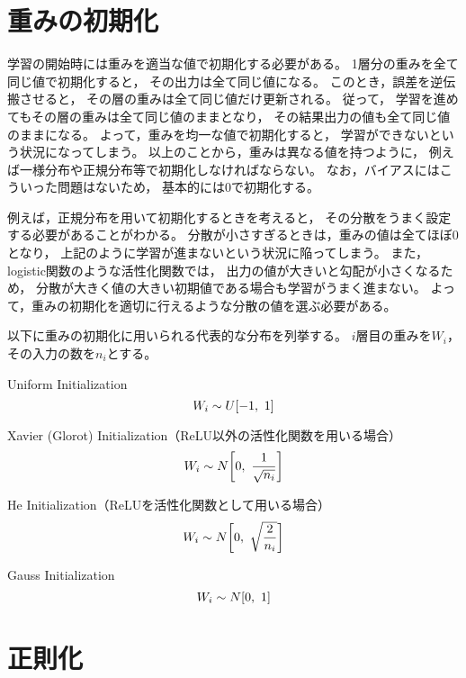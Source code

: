 \documentclass[class=jsarticle, crop=false, dvipdfmx, fleqn]{standalone}
\begin{document}
\section{重みの初期化}

学習の開始時には重みを適当な値で初期化する必要がある。
1層分の重みを全て同じ値で初期化すると，
その出力は全て同じ値になる。
このとき，誤差を逆伝搬させると，
その層の重みは全て同じ値だけ更新される。
従って，
学習を進めてもその層の重みは全て同じ値のままとなり，
その結果出力の値も全て同じ値のままになる。
よって，重みを均一な値で初期化すると，
学習ができないという状況になってしまう。
以上のことから，重みは異なる値を持つように，
例えば一様分布や正規分布等で初期化しなければならない。
なお，バイアスにはこういった問題はないため，
基本的には0で初期化する。

例えば，正規分布を用いて初期化するときを考えると，
その分散をうまく設定する必要があることがわかる。
分散が小さすぎるときは，重みの値は全てほぼ0となり，
上記のように学習が進まないという状況に陥ってしまう。
また，logistic関数のような活性化関数では，
出力の値が大きいと勾配が小さくなるため，
分散が大きく値の大きい初期値である場合も学習がうまく進まない。
よって，重みの初期化を適切に行えるような分散の値を選ぶ必要がある。

以下に重みの初期化に用いられる代表的な分布を列挙する。
$i$層目の重みを$W_i$，その入力の数を$n_i$とする。

Uniform Initialization
\begin{equation}
W_i \sim U\qty[-1,\ 1]
\end{equation}

Xavier (Glorot) Initialization（ReLU以外の活性化関数を用いる場合）
\begin{equation}
W_i \sim N\qty[0,\ \frac{1}{\sqrt{n_i}}]
\end{equation}

He Initialization（ReLUを活性化関数として用いる場合）
\begin{equation}
W_i \sim N\qty[0,\ \sqrt{\frac{2}{n_i}}]
\end{equation}

Gauss Initialization
\begin{equation}
W_i \sim N\qty[0,\ 1]
\end{equation}



\section{正則化}
\end{document}
